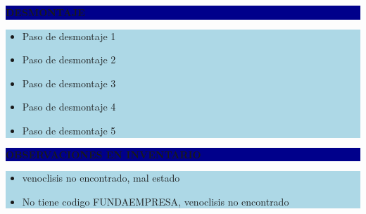 \documentclass[11pt]{article}
\newcommand{\seccionbanda}[1]{%
  \vspace{0.6em}
  \noindent\colorbox{darkblue}{\parbox{\dimexpr\linewidth-2\fboxsep}{%
    \centering\color{white}\bfseries #1}}\par\vspace{0.6em}
}
\begin{document}
\seccionbanda{DESMONTAJE}
\noindent\colorbox{lightblue}{\parbox{\dimexpr\linewidth-2\fboxsep\relax}{%
\begin{itemize}[label=$\square$, itemsep=4pt]
\item Paso de desmontaje 1
\item Paso de desmontaje 2
\item Paso de desmontaje 3
\item Paso de desmontaje 4
\item Paso de desmontaje 5
\end{itemize}
}}\par
\seccionbanda{OBSERVACIONES EN INVENTARIO}
\noindent\colorbox{lightblue}{\parbox{\dimexpr\linewidth-2\fboxsep\relax}{\begin{itemize}[itemsep=4pt]
\item venoclisis no encontrado, mal estado
\item No tiene codigo FUNDAEMPRESA, venoclisis no encontrado
\end{itemize}}}\par
\end{document}
